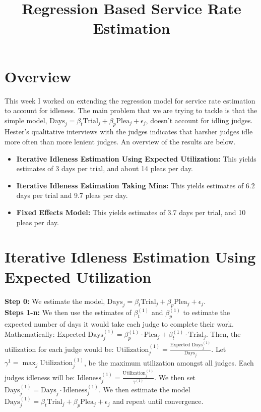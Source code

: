 \documentclass[11pt]{article}
\title{Regression Based Service Rate Estimation}
\begin{document}
\maketitle

\section{Overview}
  This week I worked on extending the regression model for service rate estimation to account for idleness.
  The main problem that we are trying to tackle is that the simple model, $\text{Days}_j = \beta_t \text{Trial}_j + \beta_p\text{Plea}_j +\epsilon_j$, doesn't account for idling judges. Hester's qualitative interviews with the judges indicates that harsher judges idle more often than more lenient judges.
  An overview of the results are below. 

  \begin{itemize}
    \item \textbf{Iterative Idleness Estimation Using Expected Utilization:} This yields estimates of 3 days per trial, and about 14 pleas per day.

    \item \textbf{Iterative Idleness Estimation Taking Mins:} This yields estimates of 6.2 days per trial and 9.7 pleas per day.

    \item \textbf{Fixed Effects Model:} This yields estimates of 3.7 days per trial, and 10 pleas per day.
  \end{itemize}

\section{Iterative Idleness Estimation Using Expected Utilization}
  \textbf{Step 0:} We estimate the model, $\text{Days}_j = \beta_t\text{Trial}_j + \beta_p\text{Plea}_j +\epsilon_j$. \\

  \noindent \textbf{Steps 1-n:} We then use the estimates of $\beta^{(1)}_t$ and $\beta^{(1)}_p$ to estimate the expected number
  of days it would take each judge to complete their work. Mathematically: $\text{Expected Days}^{(1)}_j = \beta^{(1)}_p \cdot \text{Plea}_j + \beta^{(1)}_t \cdot \text{Trial}_j$. Then, the utilization for each judge would be: $\text{Utilization}^{(1)}_j = \frac{\text{Expected Days}^{(1)}_j}{\text{Days}_j}$. Let $\gamma^1 = \max_j \text{Utilization}^{(1)}_j$, be the maximum utilization amongst all judges. Each judges idleness will be: $\text{Idleness}^{(1)}_j = \frac{\text{Utilization}^{(1)}_j}{\gamma^{(1)}}$. We then set $\text{Days}^{(1)}_j = \text{Days}_j \cdot \text{Idleness}^{(1)}_j$. We then estimate the model $\text{Days}^{(1)}_j = \beta_t\text{Trial}_j + \beta_p\text{Plea}_j +\epsilon_j$ and repeat until convergence.
\end{document}
